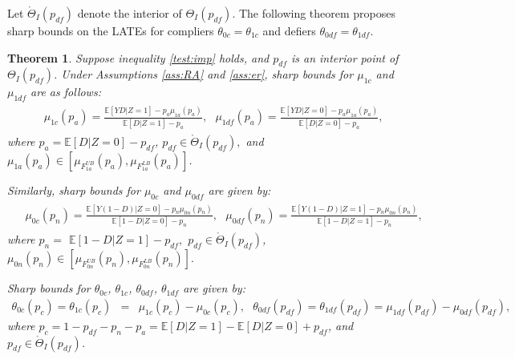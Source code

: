 \documentclass[12pt]{article}
\theoremstyle{plain}
\newtheorem{theorem}{Theorem}%
\theoremstyle{definition}
\theoremstyle{remark}
\begin{document}
Let $\mathring{\Theta}_I(p_{df})$ denote the interior of $\Theta_I(p_{df})$. The following theorem proposes sharp bounds on the LATEs for compliers $\theta_{0c}=\theta_{1c}$ and defiers $\theta_{0df}=\theta_{1df}$.  
\begin{theorem}\label{thm1}
Suppose inequality \eqref{test:imp} holds, and $p_{df}$ is an interior point of $\Theta_I(p_{df})$. Under Assumptions \ref{ass:RA} and \ref{ass:er}, sharp bounds for $\mu_{1 c}$ and $\mu_{1 d f}$ are as follows:
\begin{eqnarray*}
\begin{aligned}
& \mu_{1 c}(p_a) = \frac{\mathbb{E}[Y D  \vert  Z=1]-p_a \mu_{1 a}(p_a)}{\mathbb{E}[D  \vert  Z=1]-p_a},\ \ \ \mu_{1 d f}(p_a) = \frac{\mathbb{E}[Y D  \vert  Z=0]-p_a \mu_{1 a}(p_a)}{\mathbb{E}[D  \vert  Z=0]-p_a},%
\end{aligned}
\end{eqnarray*}
where $p_a=\mathbb{E}[D  \vert  Z=0]-p_{d f}$, $p_{df} \in \mathring{\Theta}_I(p_{df}),$ and $\mu_{1a}(p_a) \in \left[\mu_{F_{1a}^{UB}}(p_a),\mu_{F_{1a}^{LB}}(p_a)\right]$. %

Similarly, sharp bounds for $\mu_{0 c}$ and $\mu_{0 d f}$ are given by:
\begin{eqnarray*}
\begin{aligned}
& \mu_{0 c}(p_n) = \frac{\mathbb{E}[Y(1-D)  \vert  Z=0]-p_n \mu_{0 n}(p_n)}{\mathbb{E}[1-D  \vert  Z=0]-p_n},\ \ \ \mu_{0 d f}(p_n) = \frac{\mathbb{E}[Y(1-D)  \vert  Z=1]-p_n \mu_{0 n}(p_n)}{\mathbb{E}[1-D  \vert  Z=1]-p_n}, %
\end{aligned}
\end{eqnarray*}
where $p_n=$ $\mathbb{E}[1-D  \vert  Z=1]-p_{d f},$ $p_{df} \in \mathring{\Theta}_I(p_{df})$, $\mu_{0n}(p_n)\in \left[\mu_{F_{0n}^{UB}}(p_{n}),\mu_{F_{0n}^{LB}}(p_{n})\right].$ 

Sharp bounds for $\theta_{0c}$, $\theta_{1c}$, $\theta_{0df}$, $\theta_{1df}$ are given by:
\begin{eqnarray*}
    \theta_{0c}(p_c)=\theta_{1c}(p_c)&=& \mu_{1c}(p_c)-\mu_{0c}(p_c),\ \ \ \theta_{0df}(p_{df})=\theta_{1df}(p_{df})= \mu_{1df}(p_{df})-\mu_{0df}(p_{df}),
\end{eqnarray*}
where $p_c=1-p_{df}-p_n-p_a=\mathbb{E}[D  \vert  Z=1] - \mathbb{E}[D  \vert  Z=0] +p_{df}$, and $p_{df} \in \mathring{\Theta}_I(p_{df})$. 
\end{theorem}
\end{document}
